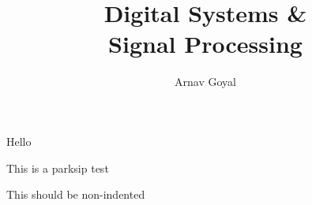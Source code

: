 

\title{Digital Systems \& \\ Signal Processing}
\author{Arnav Goyal}

\def\myreferences{
	\item Course Material \& Provided Lecture Notes
	\item Applied Digital Signal Processing - G. Manoalkis, K. Ingle
}

	
	
\frontmatter
{}
\maketitle
\tableofcontents
\preface

\mainmatter
{}


Hello

This is a parksip test

This should be non-indented
